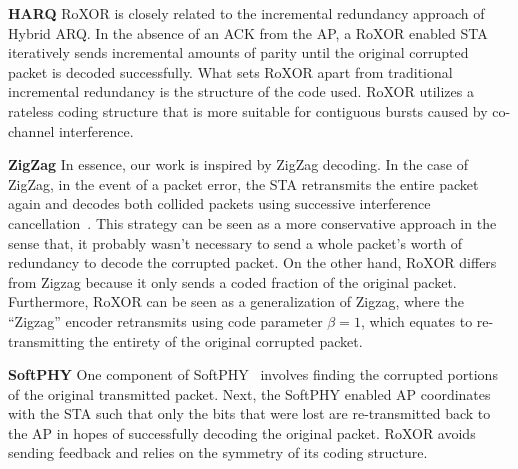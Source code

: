 \textbf{HARQ} RoXOR is closely related to the incremental redundancy approach of Hybrid ARQ. In the absence of an ACK from the AP, a RoXOR enabled STA iteratively sends incremental amounts of parity until the original corrupted packet is decoded successfully. What sets RoXOR apart from traditional incremental redundancy is the structure of the code used. RoXOR utilizes a rateless coding structure that is more suitable for contiguous bursts caused by co-channel interference.   

\textbf{ZigZag} In essence, our work is inspired by ZigZag decoding. In the case of ZigZag, in the event of a packet error,  the STA retransmits the entire packet again and decodes both collided packets using successive interference cancellation~\cite{zigzag}. This strategy can be seen as a more conservative approach in the sense that, it probably wasn't necessary to send a whole packet's worth of redundancy to decode the corrupted packet. On the other hand, RoXOR differs from Zigzag because it only sends a coded fraction of the original packet. Furthermore, RoXOR can be seen as  a generalization of Zigzag, where the ``Zigzag'' encoder retransmits using code parameter $\beta=1$, which equates to re-transmitting the entirety of the original corrupted packet.

\textbf{SoftPHY} One component of SoftPHY~\cite{softphy} involves finding the corrupted portions of the original transmitted packet. Next, the SoftPHY enabled AP coordinates with the STA such that only the bits that were lost are re-transmitted back to the AP in hopes of successfully decoding the original packet. RoXOR avoids sending feedback and relies on the symmetry of its coding structure.
